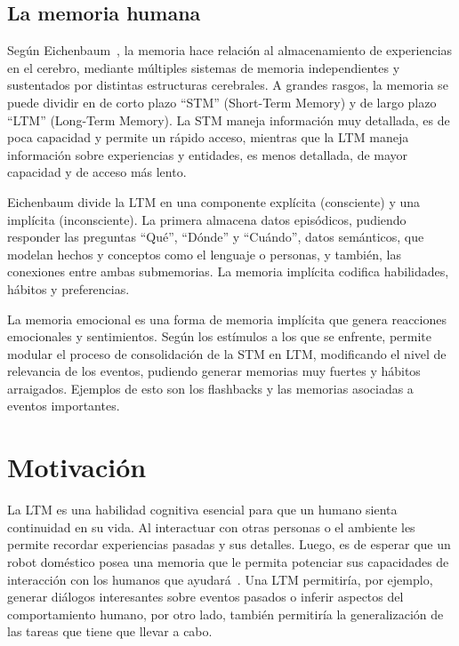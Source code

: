 \subsection{La memoria humana}

Según Eichenbaum~\cite{Eichenbaum:2008}, la memoria hace relación al almacenamiento de experiencias en el cerebro, mediante múltiples sistemas de memoria independientes y sustentados por distintas estructuras cerebrales. A grandes rasgos, la memoria se puede dividir en de corto plazo ``STM'' (Short-Term Memory) y de largo plazo ``LTM'' (Long-Term Memory). La STM maneja información muy detallada, es de poca capacidad y permite un rápido acceso, mientras que la LTM maneja información sobre experiencias y entidades, es menos detallada, de mayor capacidad y de acceso más lento.

Eichenbaum divide la LTM en una componente explícita (consciente) y una implícita (inconsciente). La primera almacena datos episódicos, pudiendo responder las preguntas ``Qué'', ``Dónde'' y ``Cuándo'', datos semánticos, que modelan hechos y conceptos como el lenguaje o personas, y también, las conexiones entre ambas submemorias. La memoria implícita codifica habilidades, hábitos y preferencias.

La memoria emocional es una forma de memoria implícita que genera reacciones emocionales y sentimientos. Según los estímulos a los que se enfrente, permite modular el proceso de consolidación de la STM en LTM, modificando el nivel de relevancia de los eventos, pudiendo generar memorias muy fuertes y hábitos arraigados. Ejemplos de esto son los flashbacks y las memorias asociadas a eventos importantes.




\section{Motivación}

La LTM es una habilidad cognitiva esencial para que un humano sienta continuidad en su vida. Al interactuar con otras personas o el ambiente les permite recordar experiencias pasadas y sus detalles. Luego, es de esperar que un robot doméstico posea una memoria que le permita potenciar sus capacidades de interacción con los humanos que ayudará~\cite{Vijayakumar2014}. Una LTM permitiría, por ejemplo, generar diálogos interesantes sobre eventos pasados o inferir aspectos del comportamiento humano, por otro lado, también permitiría la generalización de las tareas que tiene que llevar a cabo.

